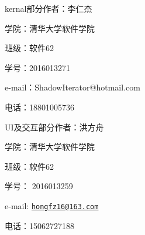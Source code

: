 \begin{DoxyItemize}
\item kernal部分作者：李仁杰~\newline

\begin{DoxyItemize}
\item 学院：清华大学软件学院~\newline

\item 班级：软件62~\newline

\item 学号：2016013271~\newline

\item e-\/mail：\+Shadow\+Iterator@hotmail.\+com~\newline

\item 电话：18801005736~\newline

\end{DoxyItemize}
\item U\+I及交互部分作者：洪方舟~\newline

\begin{DoxyItemize}
\item 学院：清华大学软件学院~\newline

\item 班级：软件62~\newline

\item 学号： 2016013259~\newline

\item e-\/mail\+: \href{mailto:hongfz16@163.com}{\tt hongfz16@163.\+com}~\newline

\item 电话：15062727188~\newline

\end{DoxyItemize}
\end{DoxyItemize}
